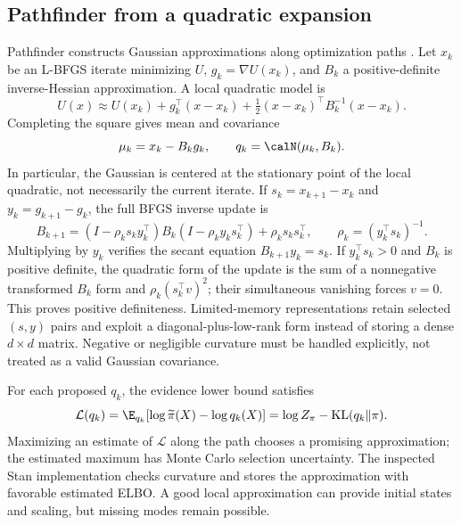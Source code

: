 \subsection{Pathfinder from a quadratic expansion}

Pathfinder constructs Gaussian approximations along optimization paths
\citep{zhang2022pathfinder}. Let
$x_k$ be an L-BFGS iterate minimizing $U$, $g_k=\nabla U(x_k)$, and $B_k$
a positive-definite inverse-Hessian approximation. A local quadratic model is
\begin{equation}
 U(x)\approx U(x_k)+g_k^\top(x-x_k)
               +\tfrac12(x-x_k)^\top B_k^{-1}(x-x_k).
 \label{eq:bf-modern-pathfinder-quadratic}
\end{equation}
Completing the square gives mean and covariance
\begin{equation}
 \mu_k=x_k-B_k g_k,\qquad q_k=\calN(\mu_k,B_k).
 \label{eq:bf-modern-pathfinder-gaussian}
\end{equation}
In particular, the Gaussian is centered at the stationary point of the local
quadratic, not necessarily the current iterate. If $s_k=x_{k+1}-x_k$ and
$y_k=g_{k+1}-g_k$, the full BFGS inverse update is
\begin{equation}
 B_{k+1}=(I-\rho_k s_k y_k^\top)B_k(I-\rho_k y_k s_k^\top)
                  +\rho_k s_k s_k^\top,\qquad
 \rho_k=(y_k^\top s_k)^{-1}.
 \label{eq:bf-modern-bfgs}
\end{equation}
Multiplying by $y_k$ verifies the secant equation $B_{k+1}y_k=s_k$.
If $y_k^\top s_k>0$ and $B_k$ is positive definite, the quadratic form of
the update is the sum of a nonnegative transformed $B_k$ form and
$\rho_k(s_k^\top v)^2$; their simultaneous vanishing forces $v=0$.
This proves positive definiteness. Limited-memory representations retain
selected $(s,y)$ pairs and exploit a diagonal-plus-low-rank form instead of
storing a dense $d\times d$ matrix. Negative or negligible curvature must be
handled explicitly, not treated as a valid Gaussian covariance.

For each proposed $q_k$, the evidence lower bound satisfies
\begin{equation}
 \mathcal L(q_k)=\E_{q_k}[\log\widetilde\pi(X)-\log q_k(X)]
        =\log Z_\pi-\mathrm{KL}(q_k\|\pi).
 \label{eq:bf-modern-pathfinder-elbo}
\end{equation}
Maximizing an estimate of $\mathcal L$ along the path chooses a promising
approximation; the estimated maximum has Monte Carlo selection uncertainty.
The inspected Stan implementation checks curvature and stores the
approximation with favorable estimated ELBO. A good local approximation can
provide initial states and scaling, but missing modes remain possible.

